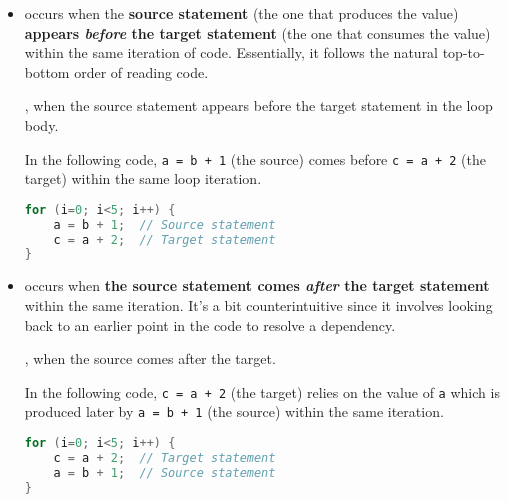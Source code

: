\begin{itemize}
    \item {} occurs when the \textbf{source statement} (the one that produces the value) \textbf{appears \emph{before} the target statement} (the one that consumes the value) within the same iteration of code. Essentially, it follows the natural top-to-bottom order of reading code.

    \begin{definitionbox}
        , when the source statement appears before the target statement in the loop body.
    \end{definitionbox}
    
    \begin{examplebox}
        In the following code, \texttt{a = b + 1} (the source) comes before \texttt{c = a + 2} (the target) within the same loop iteration.
        \begin{lstlisting}[language=c]
for (i=0; i<5; i++) {
    a = b + 1;  // Source statement
    c = a + 2;  // Target statement
}\end{lstlisting}
    \end{examplebox}

    \item {} occurs when \textbf{the source statement comes \emph{after} the target statement} within the same iteration. It's a bit counterintuitive since it involves looking back to an earlier point in the code to resolve a dependency.

    \begin{definitionbox}
        , when the source comes after the target.
    \end{definitionbox}

    \begin{examplebox}
        In the following code, \texttt{c = a + 2} (the target) relies on the value of \texttt{a} which is produced later by \texttt{a = b + 1} (the source) within the same iteration.
        \begin{lstlisting}[language=c]
for (i=0; i<5; i++) {
    c = a + 2;  // Target statement
    a = b + 1;  // Source statement
}\end{lstlisting}
    \end{examplebox}
\end{itemize}

